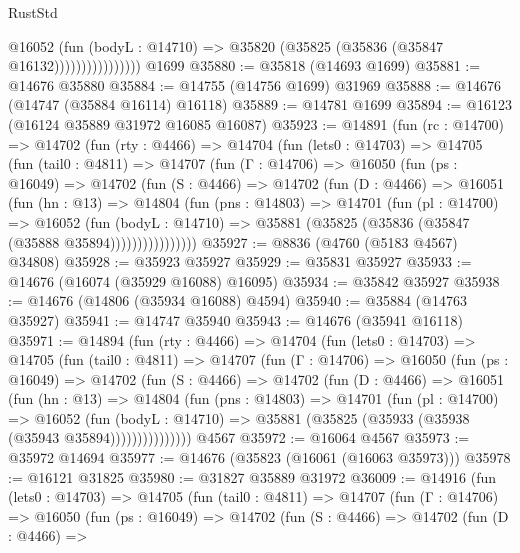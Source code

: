 \begin{lexlean}{RustStd}
\begin{coremodule}
                          @16052
                            (fun (bodyL : @14710) =>
                            @35820 (@35825 (@35836 (@35847 @16132))))))))))))))))
    @1699
@35880 := @35818 (@14693 @1699)
@35881 := @14676 @35880
@35884 := @14755 (@14756 @1699) @31969
@35888 := @14676 (@14747 (@35884 @16114) @16118)
@35889 := @14781 @1699
@35894 := @16123 (@16124 @35889 @31972 @16085 @16087)
@35923 := @14891
    (fun (rc : @14700) =>
    @14702
      (fun (rty : @4466) =>
      @14704
        (fun (lets0 : @14703) =>
        @14705
          (fun (tail0 : @4811) =>
          @14707
            (fun (Γ : @14706) =>
            @16050
              (fun (ps : @16049) =>
              @14702
                (fun (S : @4466) =>
                @14702
                  (fun (D : @4466) =>
                  @16051
                    (fun (hn : @13) =>
                    @14804
                      (fun (pns : @14803) =>
                      @14701
                        (fun (pl : @14700) =>
                        @16052
                          (fun (bodyL : @14710) =>
                          @35881 (@35825 (@35836 (@35847 (@35888 @35894))))))))))))))))
@35927 := @8836 (@4760 (@5183 @4567) @34808)
@35928 := @35923 @35927
@35929 := @35831 @35927
@35933 := @14676 (@16074 (@35929 @16088) @16095)
@35934 := @35842 @35927
@35938 := @14676 (@14806 (@35934 @16088) @4594)
@35940 := @35884 (@14763 @35927)
@35941 := @14747 @35940
@35943 := @14676 (@35941 @16118)
@35971 := @14894
    (fun (rty : @4466) =>
    @14704
      (fun (lets0 : @14703) =>
      @14705
        (fun (tail0 : @4811) =>
        @14707
          (fun (Γ : @14706) =>
          @16050
            (fun (ps : @16049) =>
            @14702
              (fun (S : @4466) =>
              @14702
                (fun (D : @4466) =>
                @16051
                  (fun (hn : @13) =>
                  @14804
                    (fun (pns : @14803) =>
                    @14701
                      (fun (pl : @14700) =>
                      @16052
                        (fun (bodyL : @14710) =>
                        @35881 (@35825 (@35933 (@35938 (@35943 @35894)))))))))))))))
    @4567
@35972 := @16064 @4567
@35973 := @35972 @14694
@35977 := @14676 (@35823 (@16061 (@16063 @35973)))
@35978 := @16121 @31825
@35980 := @31827 @35889 @31972
@36009 := @14916
    (fun (lets0 : @14703) =>
    @14705
      (fun (tail0 : @4811) =>
      @14707
        (fun (Γ : @14706) =>
        @16050
          (fun (ps : @16049) =>
          @14702
            (fun (S : @4466) =>
            @14702
              (fun (D : @4466) =>

\end{coremodule}
\end{lexlean}
